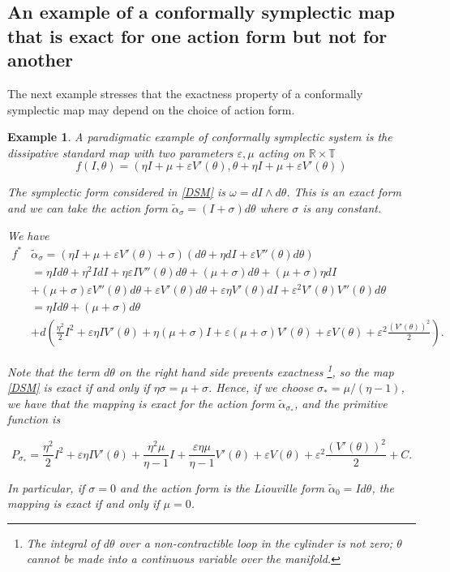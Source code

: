 \documentclass[11pt]{amsart}
\newtheorem{ex}[thm]{Example}
\theoremstyle{definition}
\theoremstyle{remark}
\numberwithin{equation}{section}
\newcommand{\R}{\mathbb R}
\newcommand{\T}{\mathbb T}
\newcommand{\eps}{\varepsilon}
\begin{document}
\medskip


\subsection{An example of a conformally symplectic map that is exact for one action form but not for another}
\label{sec:standard_map}
The next example stresses that the exactness property of a conformally symplectic map may depend on the choice of action form.

\begin{ex}
\label{ex:standard_map}
A paradigmatic example of conformally symplectic system
is the dissipative standard map with two parameters $\eps, \mu$
acting on $\R \times \T$
\begin{equation} \label{DSM}
f(I, \theta) = ( \eta I + \mu + \eps V'(\theta),
\theta +  \eta I + \mu + \eps V'(\theta) )
\end{equation}

The symplectic form considered in \eqref{DSM}   is $\omega=d I \wedge d \theta$.
This is an exact form and we can take the action form $\tilde \alpha_\sigma = (I   +\sigma) d \theta $ where $\sigma$ is any constant.



We have
\[
\begin{split}
f^* &  \tilde \alpha_\sigma   =
(\eta I + \mu + \eps V'(\theta) + \sigma)
(d \theta + \eta d I + \eps V''(\theta)
d \theta )  \\
&= \eta I d\theta  + \eta ^2 I dI  + \eta \eps I   V''(\theta) d \theta
+ ( \mu + \sigma ) d \theta + (\mu + \sigma) \eta dI  \\
&+ (\mu +\sigma)\eps V''(\theta) d \theta
+ \eps V'(\theta) d \theta + \eps \eta V'(\theta) d I
+ \eps ^2 V'(\theta) V''(\theta) d \theta  \\
&= \eta I d\theta + ( \mu + \sigma)  d \theta \\
& + d\left( \frac{\eta^2}{2} I^2 + \eps \eta I V'(\theta) +\eta( \mu + \sigma)
I + \eps (\mu+\sigma) V'(\theta)+ \eps V(\theta)+\eps ^2 \frac{(V'(\theta))^2}{2} \right) .
\end{split}
\]

Note that the term $d \theta$ on the  right hand side
prevents exactness \footnote{The integral of
$d \theta$ over a  non-contractible loop in
the cylinder is not zero; $\theta$ cannot be made into a
continuous variable over the manifold.},
so the map \eqref{DSM} is  exact if and only if  $\eta \sigma = \mu + \sigma$.
Hence, if we choose $\sigma_* = \mu/(\eta -1)$,
we have  that the mapping is exact for  the action form
$\tilde \alpha_{\sigma_*}$, and the primitive function is

\[
P_{\sigma_*}  =  \frac{\eta^2}{2} I^2 + \eps \eta I V'(\theta) +\frac{\eta^2\mu}{\eta-1}
I +\frac{ \eps\eta\mu}{\eta-1}  V'(\theta)+ \eps V(\theta)+\eps ^2 \frac{(V'(\theta))^2}{2}  + C .
\]

In particular, if $\sigma=0$ and the action form is the Liouville form $\tilde \alpha_0=I d\theta$,
the mapping is exact  if and only if $\mu=0$.
\end{ex}
\end{document}
